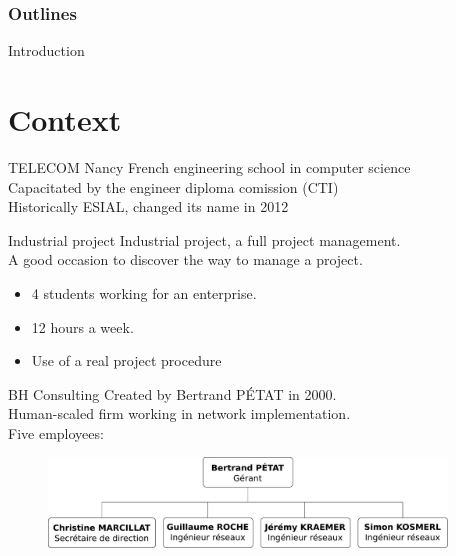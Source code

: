 \documentclass[12pt]{beamer}
\title{\titreA}
\subtitle{\titreB}
\author{Nicolas BOUGET, Julien GUEPIN, Marc PINHEDE, Julien VAUBOURG}
\institute{TELECOM Nancy}
\date{December 20, 2012}
\begin{document}
\begin{frame}
\titlepage
\end{frame}

\begin{frame}
    \frametitle{Outlines}
	\tableofcontents[pausesection]
\end{frame}

\begin{frame}{Introduction}
\end{frame}
    
\section{Context}

\begin{frame}{TELECOM Nancy}
    French engineering school in computer science\\
    \vfill
    Capacitated by the engineer diploma comission (CTI)\\
    \vfill
    Historically ESIAL, changed its name in 2012\\
    \vfill
\end{frame}



\begin{frame}{Industrial project}
    Industrial project, a full project management.\\
    \vfill
    A good occasion to discover the way to manage a project.
    \vfill
    \begin{itemize}
	\item 4 students working for an enterprise.
	\item 12 hours a week.
	\item Use of a real project procedure
    \end{itemize}
\end{frame}


    
\begin{frame}{BH Consulting}
    Created by Bertrand PÉTAT in 2000.\\
    \vfill
    Human-scaled firm working in network implementation.\\
    \vfill
    Five employees:
    \begin{figure}
	\includegraphics[width=300pt]{img/organigramme.pdf}
    \end{figure}
\end{frame}
\end{document}
